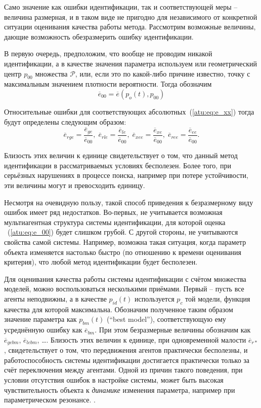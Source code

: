 Само значение как ошибки идентификации, так и соответствующей меры -- величина размерная,
и в таком виде не пригодно для
независимого от конкретной ситуации оценивания качества работы метода.
Рассмотрим возможные величины, дающие возможность обезразмерить ошибку идентификации.

В первую очередь, предположим, что вообще не проводим никакой идентификации,
а в качестве значения параметра используем или геометрический центр $p_{00}$ множества $\mathcal{P}$,
или, если это по какой-либо причине известно, точку с максимальным значением плотности вероятности.
Тогда обозначим
%
\begin{equation}
  \overline{e}_{00}
  =
  \overline{e}(p_o(t),p_{00})
  \label{atu:eq:e_00}
\end{equation}

Относительные ошибки для соответствующих абсолютных~(\ref{atu:eq:e_xx})
тогда будут определены следующим образом:
%
\begin{equation}
  \overline{e}_{rge} = \frac{\overline{e}_{ge}}{\overline{e}_{00}}, \;
  \overline{e}_{rle} = \frac{\overline{e}_{le}}{\overline{e}_{00}}, \;
  \overline{e}_{xee} = \frac{\overline{e}_{xe}}{\overline{e}_{00}}, \;
  \overline{e}_{ree} = \frac{\overline{e}_{ee}}{\overline{e}_{00}}.
  \label{atu:eq:e_rxx}
\end{equation}

Близость этих величин к единице свидетельствует о том, что
данный метод идентификации в рассматриваемых условиях бесполезен.
Более того, при серьёзных нарушениях в процессе поиска,
например при потере устойчивости, эти величины могут и превосходить единицу.

Несмотря на очевидную пользу, такой способ приведения к безразмерному виду ошибок
имеет ряд недостатков. Во-первых,
не учитывается возможная мультиагентная структура системы идентификации,
для которой оценка ~(\ref{atu:eq:e_00}) будет слишком грубой.
С другой стороны,
не учитываются свойства
самой системы. Например, возможна такая ситуация, когда параметр
объекта изменяется настолько быстро (по отношению к времени оценивания критерия),
что любой метод идентификации будет бесполезен.

Для оценивания качества работы системы идентификации с счётом
множества моделей, можно воспользоваться несколькими приёмами.
Первый -- пусть все агенты неподвижны, а в качестве $p_{id}(t)$
используется $p_c$ той модели, функция качества для которой
максимальна. Обозначим полученное таким образом значение
параметра как $p_{bm}(t)$ (``best model''),
соответствующую ему усреднённую ошибку как $\overline{e}_{bm}$.
При этом безразмерные величины обозначим как
$\overline{e}_{gebm}$, $\overline{e}_{lebm}$,  \ldots.
Близость этих величин к единице, при одновременной малости
$\overline{e}_{r*}$, свидетельствует о том, что передвижения
агентов практически бесполезны, и работоспособность системы идентификации достигается
практически только за счёт переключения между агентами.
Одной из причин такого поведения, при условии отсутствия ошибок
в настройке системы, может быть высокая чувствительность
объекта к \textit{динамике} изменения параметра, например
при параметрическом резонансе. .

